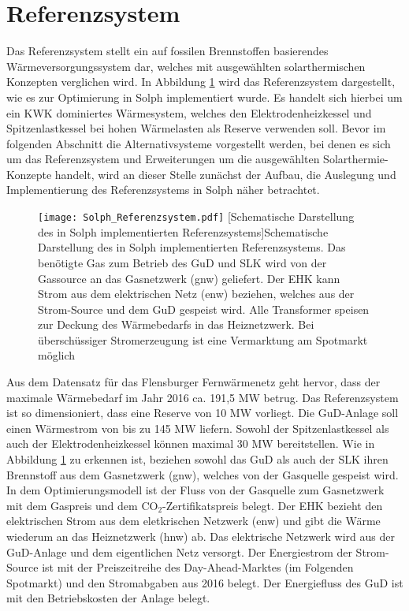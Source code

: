 \section{Referenzsystem}
Das Referenzsystem stellt ein auf fossilen Brennstoffen basierendes Wärmeversorgungssystem dar, welches mit ausgewählten solarthermischen Konzepten verglichen wird. In Abbildung \ref{fig: Schema Referenzsystem} wird das Referenzsystem dargestellt, wie es zur Optimierung in Solph implementiert wurde. Es handelt sich hierbei um ein \ac{KWK} dominiertes Wärmesystem, welches den Elektrodenheizkessel und Spitzenlastkessel bei hohen Wärmelasten als Reserve verwenden soll. Bevor im folgenden Abschnitt die Alternativsysteme vorgestellt werden, bei denen es sich um das Referenzsystem und Erweiterungen um die ausgewählten Solarthermie-Konzepte handelt, wird an dieser Stelle zunächst der Aufbau, die Auslegung und Implementierung des Referenzsystems in Solph näher betrachtet.
	\begin{figure}[ht]
		\centering
		\texttt{[image: Solph\_Referenzsystem.pdf]}
		[Schematische Darstellung des in Solph implementierten Referenzsystems]{Schematische Darstellung des in Solph implementierten Referenzsystems. Das benötigte Gas zum Betrieb des \ac{GuD} und \ac{SLK} wird von der Gassource an das Gasnetzwerk (gnw) geliefert. Der \ac{EHK} kann Strom aus dem elektrischen Netz (enw) beziehen, welches aus der Strom-Source und dem \ac{GuD} gespeist wird. Alle Transformer speisen zur Deckung des Wärmebedarfs in das Heiznetzwerk. Bei überschüssiger Stromerzeugung ist eine Vermarktung am Spotmarkt möglich}
		\label{fig: Schema Referenzsystem}
	\end{figure}

Aus dem Datensatz für das Flensburger Fernwärmenetz geht hervor, dass der maximale Wärmebedarf im Jahr 2016 ca. 191,5 MW betrug. Das Referenzsystem ist so dimensioniert, dass eine Reserve von 10 MW vorliegt. Die \ac{GuD}-Anlage soll einen Wärmestrom von bis zu 145 MW liefern. Sowohl der Spitzenlastkessel als auch der Elektrodenheizkessel können maximal 30 MW bereitstellen. Wie in Abbildung \ref{fig: Schema Referenzsystem} zu erkennen ist, beziehen sowohl das \ac{GuD} als auch der \ac{SLK} ihren Brennstoff aus dem Gasnetzwerk (gnw), welches von der Gasquelle gespeist wird. In dem Optimierungsmodell ist der Fluss von der Gasquelle zum Gasnetzwerk mit dem Gaspreis und dem CO$_2$-Zertifikatspreis belegt. Der \ac{EHK} bezieht den elektrischen Strom aus dem eletkrischen Netzwerk (enw) und gibt die Wärme wiederum an das Heiznetzwerk (hnw) ab. Das elektrische Netzwerk wird aus der \ac{GuD}-Anlage und dem eigentlichen Netz versorgt. Der Energiestrom der Strom-Source ist mit der Preiszeitreihe des Day-Ahead-Marktes (im Folgenden Spotmarkt) und den Stromabgaben aus 2016 belegt. Der Energiefluss des \ac{GuD} ist mit den Betriebskosten der Anlage belegt. 

